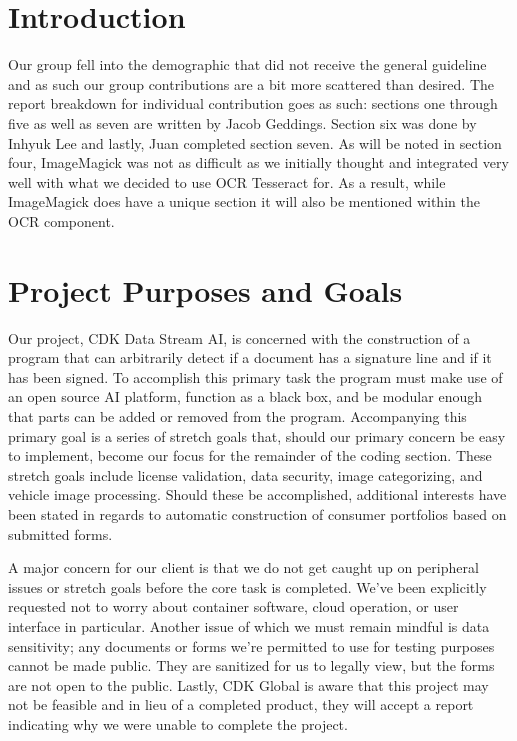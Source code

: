 \documentclass[onecolumn, draftclsnofoot,10pt, compsoc]{IEEEtran}
\begin{document}
\section{Introduction}
Our group fell into the demographic that did not receive the general guideline and as such our group contributions are a bit more scattered than desired. The report breakdown for individual contribution goes as such: sections one through five as well as seven are written by Jacob Geddings. Section six was done by Inhyuk Lee and lastly, Juan completed section seven. As will be noted in section four, ImageMagick was not as difficult as we initially thought and integrated very well with what we decided to use OCR Tesseract for. As a result, while ImageMagick does have a unique section it will also be mentioned within the OCR component.

\section{Project Purposes and Goals}
Our project, CDK Data Stream AI, is concerned with the construction of a program that can arbitrarily detect if a document has a signature line and if it has been signed. To accomplish this primary task the program must make use of an open source AI platform, function as a black box, and be modular enough that parts can be added or removed from the program. Accompanying this primary goal is a series of stretch goals that, should our primary concern be easy to implement, become our focus for the remainder of the coding section. These stretch goals include license validation, data security, image categorizing, and vehicle image processing. Should these be accomplished, additional interests have been stated in regards to automatic construction of consumer portfolios based on submitted forms. 

A major concern for our client is that we do not get caught up on peripheral issues or stretch goals before the core task is completed. We’ve been explicitly requested not to worry about container software, cloud operation, or user interface in particular. Another issue of which we must remain mindful is data sensitivity; any documents or forms we’re permitted to use for testing purposes cannot be made public. They are sanitized for us to legally view, but the forms are not open to the public. Lastly, CDK Global is aware that this project may not be feasible and in lieu of a completed product, they will accept a report indicating why we were unable to complete the project. 
\end{document}
